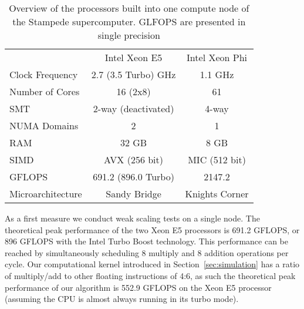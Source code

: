 \documentclass{sig-alternate}
\newcommand{\upp}{\vspace*{-0.5em}}
\newcommand{\up}{\vspace*{-0.25em}}
\begin{document}
\begin{table}
    \centering
    \vspace*{0.2em}
    \begin{tabular}{lcc}
      \toprule
                                  & Intel Xeon E5           & Intel Xeon Phi \\
      \cmidrule(r){1-1} \cmidrule(lr){2-2} \cmidrule(l){3-3}
        Clock Frequency           & 2.7 (3.5 Turbo) GHz & 1.1 GHz        \\
        Number of Cores           & 16 (2x8)                & 61             \\
        SMT                       & 2-way (deactivated)     & 4-way          \\
        NUMA Domains              & 2                       & 1              \\
        RAM          & 32 GB                   & 8 GB           \\
        SIMD                      & AVX (256 bit)           & MIC (512 bit)  \\
        GFLOPS & 691.2 (896.0 Turbo)     & 2147.2         \\
        Microarchitecture         & Sandy Bridge            & Knights Corner \\
        \bottomrule
    \end{tabular}
    \upp\upp
    \caption{Overview of the processors built into one compute node of the
    Stampede supercomputer. GLFOPS are presented in single precision}
    \label{tab:stampede}
\end{table}

As a first measure we conduct weak scaling tests on a single node. The theoretical
peak performance of the two Xeon E5 processors is 691.2 GFLOPS, or 896
GFLOPS with the Intel Turbo Boost technology. This performance can be reached by
simultaneously scheduling 8 multiply and 8 addition operations
per cycle. Our computational kernel introduced in Section~\ref{sec:simulation}
has a ratio of multiply/add to other floating instructions of 4:6, as such the
theoretical peak performance of our algorithm is 552.9 GFLOPS on the Xeon E5
processor (assuming the CPU is almost always running in its turbo mode).
\end{document}

